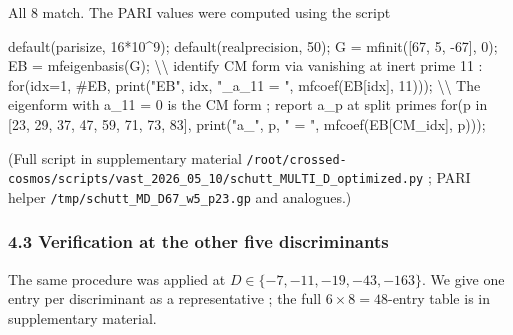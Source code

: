\documentclass[
  11pt,
  a4paper,
]{amsart}
\newenvironment{Shaded}{}{}
\newcommand{\NormalTok}[1]{#1}
\begin{document}
All 8 match. The PARI values were computed using the script

\begin{Shaded}
\begin{Highlighting}[]
\NormalTok{default(parisize, 16*10\^{}9);}
\NormalTok{default(realprecision, 50);}
\NormalTok{G = mfinit([67, 5, {-}67], 0);}
\NormalTok{EB = mfeigenbasis(G);}
\NormalTok{\textbackslash{}\textbackslash{} identify CM form via vanishing at inert prime 11 :}
\NormalTok{for(idx=1, \#EB, print("EB", idx, "\_a\_11 = ", mfcoef(EB[idx], 11)));}
\NormalTok{\textbackslash{}\textbackslash{} The eigenform with a\_11 = 0 is the CM form ; report a\_p at split primes}
\NormalTok{for(p in [23, 29, 37, 47, 59, 71, 73, 83],}
\NormalTok{    print("a\_", p, " = ", mfcoef(EB[CM\_idx], p)));}
\end{Highlighting}
\end{Shaded}

(Full script in supplementary material \texttt{/root/crossed-cosmos/scripts/vast\_2026\_05\_10/schutt\_MULTI\_D\_optimized.py} ; PARI helper \texttt{/tmp/schutt\_MD\_D67\_w5\_p23.gp} and analogues.)

\hypertarget{verification-at-the-other-five-discriminants}{%
\subsubsection{4.3 Verification at the other five discriminants}\label{verification-at-the-other-five-discriminants}}

The same procedure was applied at \(D \in \{-7, -11, -19, -43, -163\}\). We give one entry per discriminant as a representative ; the full \(6 \times 8 = 48\)-entry table is in supplementary material.
\end{document}
